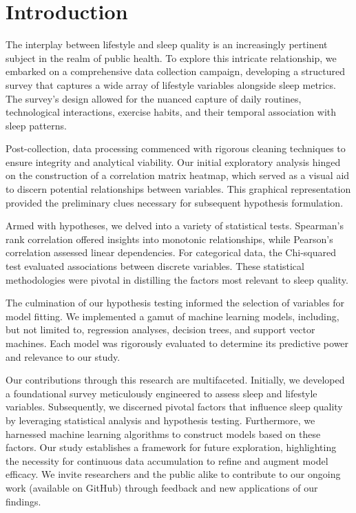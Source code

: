 \documentclass[conference]{IEEEtran}
\begin{document}
\section{Introduction}
The interplay between lifestyle and sleep quality is an increasingly pertinent subject in the realm of public health. To explore this intricate relationship, we embarked on a comprehensive data collection campaign, developing a structured survey that captures a wide array of lifestyle variables alongside sleep metrics. The survey's design allowed for the nuanced capture of daily routines, technological interactions, exercise habits, and their temporal association with sleep patterns.

Post-collection, data processing commenced with rigorous cleaning techniques to ensure integrity and analytical viability. Our initial exploratory analysis hinged on the construction of a correlation matrix heatmap, which served as a visual aid to discern potential relationships between variables. This graphical representation provided the preliminary clues necessary for subsequent hypothesis formulation.

Armed with hypotheses, we delved into a variety of statistical tests. Spearman's rank correlation offered insights into monotonic relationships, while Pearson's correlation assessed linear dependencies. For categorical data, the Chi-squared test\cite{chi} evaluated associations between discrete variables. These statistical methodologies were pivotal in distilling the factors most relevant to sleep quality.

The culmination of our hypothesis testing informed the selection of variables for model fitting. We implemented a gamut of machine learning models, including, but not limited to, regression analyses, decision trees, and support vector machines. Each model was rigorously evaluated to determine its predictive power and relevance to our study.

Our contributions through this research are multifaceted. Initially, we developed a foundational survey meticulously engineered to assess sleep and lifestyle variables. Subsequently, we discerned pivotal factors that influence sleep quality by leveraging statistical analysis and hypothesis testing. Furthermore, we harnessed machine learning algorithms to construct models based on these factors. Our study establishes a framework for future exploration, highlighting the necessity for continuous data accumulation to refine and augment model efficacy. We invite researchers and the public alike to contribute to our ongoing work (available on GitHub\footnotemark) through feedback and new applications of our findings.
\end{document}
